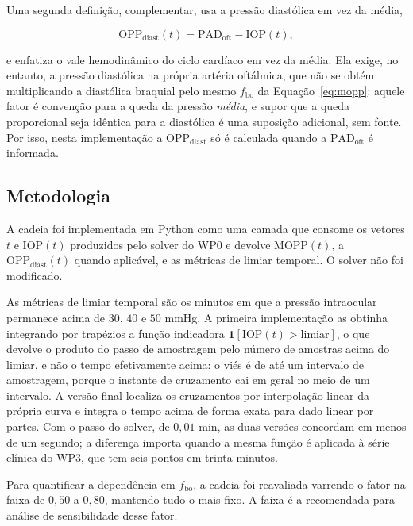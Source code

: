 Uma segunda definição, complementar, usa a pressão diastólica em vez da média,

\begin{equation}
\mathrm{OPP}_{\mathrm{diast}}(t)=\mathrm{PAD}_{\mathrm{oft}}-\mathrm{IOP}(t),
\label{eq:oppdiast}
\end{equation}

e enfatiza o vale hemodinâmico do ciclo cardíaco em vez da média. Ela exige, no entanto, a pressão diastólica na própria artéria oftálmica, que não se obtém multiplicando a diastólica braquial pelo mesmo $f_{\mathrm{bo}}$ da Equação~\ref{eq:mopp}: aquele fator é convenção para a queda da pressão \emph{média}, e supor que a queda proporcional seja idêntica para a diastólica é uma suposição adicional, sem fonte. Por isso, nesta implementação a $\mathrm{OPP}_{\mathrm{diast}}$ só é calculada quando a $\mathrm{PAD}_{\mathrm{oft}}$ é informada.

\subsection{Metodologia}

A cadeia foi implementada em Python como uma camada que consome os vetores $t$ e $\mathrm{IOP}(t)$ produzidos pelo solver do WP0 e devolve $\mathrm{MOPP}(t)$, a $\mathrm{OPP}_{\mathrm{diast}}(t)$ quando aplicável, e as métricas de limiar temporal. O solver não foi modificado.

As métricas de limiar temporal são os minutos em que a pressão intraocular permanece acima de $30$, $40$ e $50$ mmHg. A primeira implementação as obtinha integrando por trapézios a função indicadora $\mathbf{1}[\mathrm{IOP}(t)>\text{limiar}]$, o que devolve o produto do passo de amostragem pelo número de amostras acima do limiar, e não o tempo efetivamente acima: o viés é de até um intervalo de amostragem, porque o instante de cruzamento cai em geral no meio de um intervalo. A versão final localiza os cruzamentos por interpolação linear da própria curva e integra o tempo acima de forma exata para dado linear por partes. Com o passo do solver, de $0{,}01$ min, as duas versões concordam em menos de um segundo; a diferença importa quando a mesma função é aplicada à série clínica do WP3, que tem seis pontos em trinta minutos.

Para quantificar a dependência em $f_{\mathrm{bo}}$, a cadeia foi reavaliada varrendo o fator na faixa de $0{,}50$ a $0{,}80$, mantendo tudo o mais fixo. A faixa é a recomendada para análise de sensibilidade desse fator.


